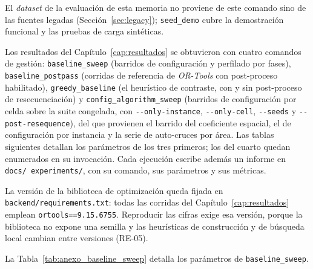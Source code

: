 El \textit{dataset} de la evaluación de esta memoria no proviene de este comando sino
de las fuentes legadas (Sección~\ref{sec:legacy}); \texttt{seed\_demo} cubre la
demostración funcional y las pruebas de carga sintéticas.

\label{anx:comandos}

Los resultados del Capítulo~\ref{cap:resultados} se obtuvieron con cuatro comandos de
gestión: \texttt{baseline\_sweep} (barridos de configuración y perfilado por fases),
\texttt{baseline\_postpass} (corridas de referencia de \textit{OR-Tools} con
post-proceso habilitado), \texttt{greedy\_baseline} (el heurístico de contraste, con
y sin post-proceso de resecuenciación) y \texttt{config\_algorithm\_sweep} (barridos de
configuración por celda sobre la suite congelada, con \texttt{-{}-only-instance},
\texttt{-{}-only-cell}, \texttt{-{}-seeds} y \texttt{-{}-post-resequence}), del que
provienen el barrido del coeficiente espacial, el de configuración por instancia y la
serie de auto-cruces por área. Las tablas siguientes detallan los parámetros
de los tres primeros; los del cuarto quedan enumerados en su invocación. Cada ejecución escribe además un informe en \texttt{docs\slash
experiments\slash }, con su comando, sus parámetros y sus métricas.

La versión de la biblioteca de optimización queda fijada en
\texttt{backend\slash requirements.txt}: todas las corridas del
Capítulo~\ref{cap:resultados} emplean \texttt{ortools==9.15.6755}. Reproducir las cifras
exige esa versión, porque la biblioteca no expone una semilla y las heurísticas de
construcción y de búsqueda local cambian entre versiones (RE-05).

La Tabla~\ref{tab:anexo_baseline_sweep} detalla los parámetros de \texttt{baseline\_sweep}.

